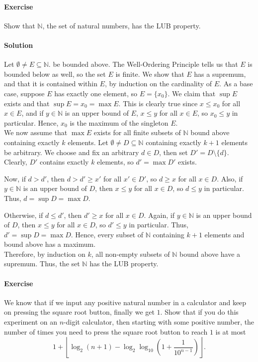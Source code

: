 \documentclass[10pt]{article}
\newcounter{prob}
\def\problem{\stepcounter{prob}\paragraph{Exercise \arabic{prob}}}
\def\solution{\paragraph{Solution}}
\begin{document}
        \problem Show that $\mathbb{N}$, the set of natural numbers, has the LUB property.
        \solution Let $\emptyset \neq E \subseteq \mathbb{N}$. be bounded above.
        The Well-Ordering Principle tells us that $E$ is bounded below as well, so the set $E$ is finite.
        We show that $E$ has a supremum, and that it is contained within $E$, by induction on the cardinality of $E$.
        As a base case, suppose $E$ has exactly one element, so $E = \{x_0\}$.
        We claim that $\sup E$ exists and that $\sup E = x_0 = \max E$.
        This is clearly true since $x \leq x_0$ for all $x \in E$, and if $y \in \mathbb{N}$ is an upper bound of $E$,
        $x \leq y$ for all $x \in E$, so $x_0 \leq y$ in particular. Hence, $x_0$ is the maximum of the singleton $E$. \\

        We now assume that $\max E$ exists for all finite subsets of $\mathbb{N}$ bound above containing exactly $k$ elements.
        Let $\emptyset \neq D \subseteq \mathbb{N}$ containing exactly $k + 1$ elements be arbitrary. We choose and fix an arbitrary $d \in D$,
        then set $D' = D\setminus\{d\}$. Clearly, $D'$ contains exactly $k$ elements, so $d' = \max D'$ exists.

        Now, if $d > d'$, then $d > d' \geq x'$ for all $x' \in D'$, so $d \geq x$ for all $x \in D$. Also, if $y \in \mathbb{N}$
        is an upper bound of $D$, then $x \leq y$ for all $x \in D$, so $d \leq y$ in particular. Thus, $d = \sup D = \max D$.
        
        Otherwise, if $d \leq d'$, then $d' \geq x$ for all $x \in D$. Again, if $y \in \mathbb{N}$ is an upper bound of $D$,
        then $x \leq y$ for all $x \in D$, so $d' \leq y$ in particular. Thus, $d' = \sup{D} = \max{D}$. Hence,
        every subset of $\mathbb{N}$ containing $k + 1$ elements and bound above has a maximum. \\
        
        Therefore, by induction on $k$, all non-empty subsets of $\mathbb{N}$ bound above have a supremum. Thus, the set $\mathbb{N}$ has the
        LUB property.

        \problem We know that if we input any positive natural number in a calculator and keep on pressing the square root button, finally we get $1$.
        Show that if you do this experiment on an $n$-digit calculator, then starting with some positive number, the number of times you need to
        press the square root button to reach $1$ is at most 
        \[
                1 + \left\lfloor \log_2(n + 1) - \log_2{\log_{10}\left( 1 + \frac{1}{10^{n-1}} \right)} \right\rfloor.
        \]
\end{document}
